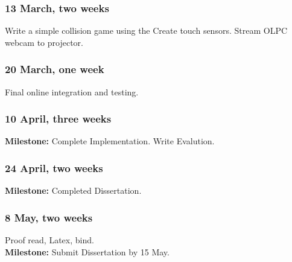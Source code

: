 \subsubsection*{13 March, two weeks}
Write a simple collision game using the Create touch sensors. 
Stream OLPC webcam to projector.

\subsubsection*{20 March, one week}
Final online integration and testing.

\subsubsection*{10 April, three weeks}
{\bf Milestone:} Complete Implementation. Write Evalution.

\subsubsection*{24 April, two weeks}
{\bf Milestone:} Completed Dissertation.

\subsubsection*{8 May, two weeks}
Proof read, Latex, bind.
\\{\bf Milestone:} Submit Dissertation by 15 May.
